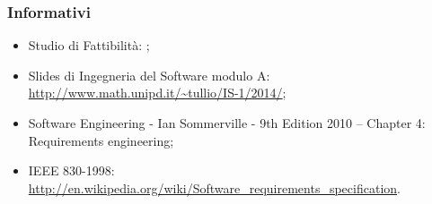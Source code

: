 	\subsubsection{Informativi}
		\begin{itemize}
			\item Studio di Fattibilità: \docNameVersionSdF;
			\item Slides di Ingegneria del Software modulo A: \url{http://www.math.unipd.it/~tullio/IS-1/2014/};
			\item Software Engineering - Ian Sommerville - 9th Edition 2010 – Chapter 4: Requirements engineering;
			\item IEEE 830-1998: \url{http://en.wikipedia.org/wiki/Software_requirements_specification}.
		\end{itemize}
